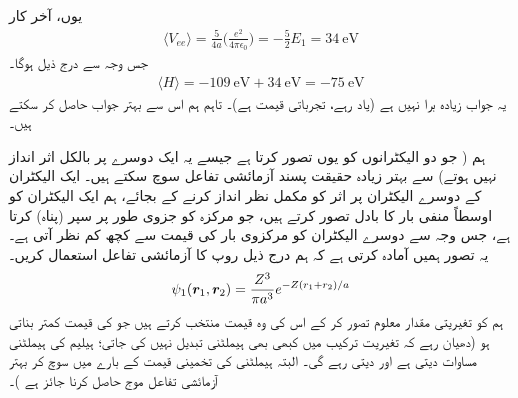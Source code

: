 یوں، آخر کار
\begin{align}\label{مساوات_تغیریتی_مخفیہ_توقعاتی_قیمت}
\langle V_{ee} \rangle=\frac{5}{4a}\big(\frac{e^{2}}{4\pi\epsilon_{0}}\big)=-\frac{5}{2}E_{1}=\SI{34}{\electronvolt} 
\end{align}
 جس وجہ سے درج ذیل ہوگا۔
\begin{align}
\langle H \rangle =\SI{-109}{\electronvolt}+\SI{34}{\electronvolt}=\SI{-75}{\electronvolt} 
\end{align}
یہ جواب زیادہ برا نہیں ہے (یاد رہے، تجرباتی قیمت  ہے)۔ تاہم ہم اس سے بہتر جواب حاصل کر سکتے ہیں۔

ہم ( جو دو الیکٹرانوں کو یوں تصور کرتا ہے جیسے یہ ایک دوسرے پر بالکل اثر انداز نہیں ہوتے) سے بہتر زیادہ حقیقت پسند آزمائشی تفاعل سوچ سکتے ہیں۔ ایک الیکٹران کے دوسرے الیکٹران پر اثر کو مکمل نظر انداز کرنے کے بجائے، ہم ایک الیکٹران کو اوسطاً منفی بار کا بادل تصور کرتے ہیں، جو مرکزہ کو جزوی طور پر سپر (پناہ) کرتا ہے، جس وجہ سے دوسرے الیکٹران کو  مرکزوی بار  کی قیمت  سے کچھ کم نظر آتی ہے۔ یہ تصور ہمیں آمادہ کرتی ہے کہ ہم درج ذیل روپ کا آزمائشی تفاعل استعمال کریں۔
\begin{align}\label{مساوات_تغیریت_آزمائشی_سپر}
\psi_{1}({{\boldsymbol{r}}}_{1},{{\boldsymbol{r}}}_{2})=\frac{Z^{3}}{\pi a^{3}}e^{-Z(r_{1}+r_{2})/a} 
\end{align}
 ہم  کو تغیریتی مقدار معلوم تصور کر کے اس کی وہ قیمت منتخب کرتے ہیں جو  کی قیمت کمتر بناتی ہو (دھیان رہے کہ تغیریت ترکیب میں کبھی بھی ہیملٹنی تبدیل نہیں کی جاتی؛ ہیلیم کی ہیملٹنی مساوات  دیتی ہے اور دیتی رہے گی۔ البتہ ہیملٹنی کی تخمینی قیمت کے بارے میں سوچ کر بہتر آزمائشی تفاعل موج حاصل کرنا جائز ہے )۔
 
